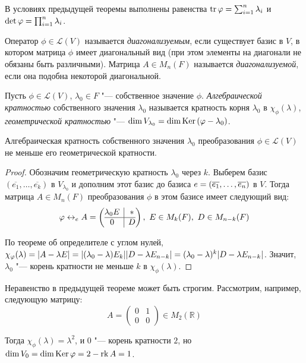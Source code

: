 \begin{corollary}
	В условиях предыдущей теоремы выполнены равенства $\operatorname{tr}{\varphi} = \sum_{i = 1}^n\lambda_i$ и $\det{\phi} \hm{=} \prod_{i = 1}^n\lambda_i$.
\end{corollary}

\begin{definition}
	Оператор $\phi \in \mathcal{L}(V)$ называется \textit{диагонализуемым}, если существует базис в $V$, в котором матрица $\phi$ имеет диагональный вид (при этом элементы на диагонали не обязаны быть различными). Матрица $A \in M_n(F)$ называется \textit{диагонализуемой}, если она подобна некоторой диагональной.
\end{definition}

\begin{definition}
	Пусть $\phi \in \mathcal{L}(V)$, $\lambda_0 \in F$ "--- собственное значение $\phi$. \textit{Алгебраической кратностью} собственного значения $\lambda_0$ называется кратность корня $\lambda_0$ в $\chi_\phi(\lambda)$, \textit{геометрической кратностью} "--- $\dim{V_{\lambda_0}} = \dim{\operatorname{Ker}{(\ensuremath{\varphi}- \lambda_0)}}$.
\end{definition}

\begin{theorem}
	Алгебраическая кратность собственного значения $\lambda_0$ преобразования $\phi \in \mathcal{L}(V)$ не меньше его геометрической кратности.
\end{theorem}

\begin{proof}
	Обозначим геометрическую кратность $\lambda_0$ через $k$. Выберем базис $(\overline{e_1}, \dots, \overline{e_k})$ в $V_{\lambda_0}$ и дополним этот базис до базиса $e \hm{=} (\overline{e_1}, \dots, \overline{e_n})$ в $V$. Тогда матрица $A \in M_n(F)$ преобразования $\phi$ в этом базисе имеет следующий вид:
	\[
	\phi \leftrightarrow_e A =
	\left(\begin{array}{@{}c|c@{}}
		\lambda_0 E & *\\
		\hline
		0 & D\end{array}\right),~E \in M_k(F),~D \in M_{n - k}(F)
	\]
	
	По теореме об определителе с углом нулей, $\chi_\phi(\lambda) = |A - \lambda E| = |(\lambda_0 - \lambda)E_k||D - \lambda E_{n - k}| \hm= (\lambda_0 - \lambda)^k|D - \lambda E_{n - k}|$. Значит, $\lambda_0$ "--- корень кратности не меньше $k$ в $\chi_\phi(\lambda)$.
\end{proof}

\begin{note}
	Неравенство в предыдущей теореме может быть строгим. Рассмотрим, например, следующую матрицу:
	\[A = \begin{pmatrix}0 & 1\\0 & 0\end{pmatrix} \in M_2(\mathbb{R})\]
	
	Тогда $\chi_\phi(\lambda) = \lambda^2$, и $0$ "--- корень кратности $2$, но $\dim{V_0} = \dim{\operatorname{Ker}{\ensuremath{\varphi}}} = 2 - \operatorname{rk}{A} = 1$.
\end{note}

